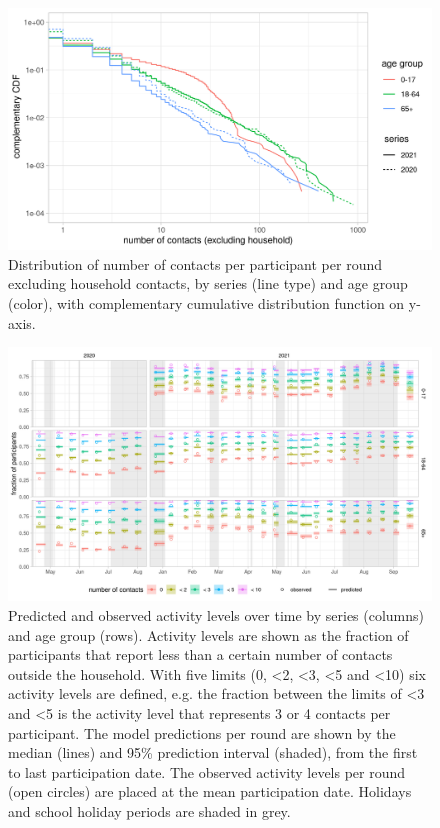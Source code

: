 \documentclass[fleqn,10pt]{wlscirep}
\begin{document}
\clearpage


\begin{figure}[ht]
\centering
\includegraphics[width=\linewidth]{../figures/powerlaw_contacts.png}
\caption{Distribution of number of contacts per participant per round excluding household contacts, by series (line type) and age group (color), with complementary cumulative distribution function on y-axis.}
\label{fig:powerlaw}
\end{figure}

\clearpage

\begin{figure}[ht]
\centering
\includegraphics[width=\linewidth]{../figures/prediction_studypopulation_cat6.png}
\caption{Predicted and observed activity levels over time by series (columns) and age group (rows). Activity levels are shown as the fraction of participants that report less than a certain number of contacts outside the household. With five limits (0, <2, <3, <5 and <10) six activity levels are defined, e.g. the fraction between the limits of <3 and <5 is the activity level that represents 3 or 4 contacts per participant. The model predictions per round are shown by the median (lines) and 95\% prediction interval (shaded), from the first to last participation date. The observed activity levels per round (open circles) are placed at the mean participation date. Holidays and school holiday periods are shaded in grey.}
\label{fig:studypop}
\end{figure}
\end{document}
